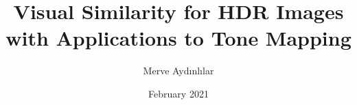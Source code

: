 \documentclass[chaparabic,ceng,phd,12pt,oneandhalf,fivejury]{metu}
\author{Merve Aydınlılar}
\title{Visual Similarity for HDR Images with Applications to Tone Mapping}
\date{February 2021}
\begin{document}
\begin{preliminaries}


\end{preliminaries}
%   
% 
%

\setlength{\parindent}{0em}
\setlength{\parskip}{10pt}











%
%

%

\appendix





\end{document}
